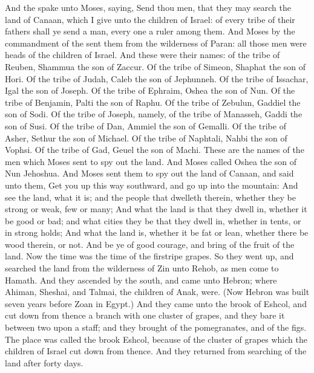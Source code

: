 \begin{biblechapter} %
 And the \LORD spake unto Moses, saying,
\verse Send thou men, that they may search the land of Canaan, which I give unto the children of Israel: of every tribe of their fathers shall ye send a man, every one a ruler among them.
\verse And Moses by the commandment of the \LORD sent them from the wilderness of Paran: all those men were heads of the children of Israel.
\verse And these were their names: of the tribe of Reuben, Shammua the son of Zaccur.
\verse Of the tribe of Simeon, Shaphat the son of Hori.
\verse Of the tribe of Judah, Caleb the son of Jephunneh.
\verse Of the tribe of Issachar, Igal the son of Joseph.
\verse Of the tribe of Ephraim, Oshea the son of Nun.
\verse Of the tribe of Benjamin, Palti the son of Raphu.
\verse Of the tribe of Zebulun, Gaddiel the son of Sodi.
\verse Of the tribe of Joseph, namely, of the tribe of Manasseh, Gaddi the son of Susi.
\verse Of the tribe of Dan, Ammiel the son of Gemalli.
\verse Of the tribe of Asher, Sethur the son of Michael.
\verse Of the tribe of Naphtali, Nahbi the son of Vophsi.
\verse Of the tribe of Gad, Geuel the son of Machi.
\verse These are the names of the men which Moses sent to spy out the land. And Moses called Oshea the son of Nun Jehoshua.
\verse And Moses sent them to spy out the land of Canaan, and said unto them, Get you up this way southward, and go up into the mountain:
\verse And see the land, what it is; and the people that dwelleth therein, whether they be strong or weak, few or many;
\verse And what the land is that they dwell in, whether it be good or bad; and what cities they be that they dwell in, whether in tents, or in strong holds;
\verse And what the land is, whether it be fat or lean, whether there be wood therein, or not. And be ye of good courage, and bring of the fruit of the land. Now the time was the time of the firstripe grapes.
\verse So they went up, and searched the land from the wilderness of Zin unto Rehob, as men come to Hamath.
\verse And they ascended by the south, and came unto Hebron; where Ahiman, Sheshai, and Talmai, the children of Anak, were. (Now Hebron was built seven years before Zoan in Egypt.)
\verse And they came unto the brook of Eshcol, and cut down from thence a branch with one cluster of grapes, and they bare it between two upon a staff; and they brought of the pomegranates, and of the figs.
\verse The place was called the brook Eshcol, because of the cluster of grapes which the children of Israel cut down from thence.
\verse And they returned from searching of the land after forty days.

\end{biblechapter}
